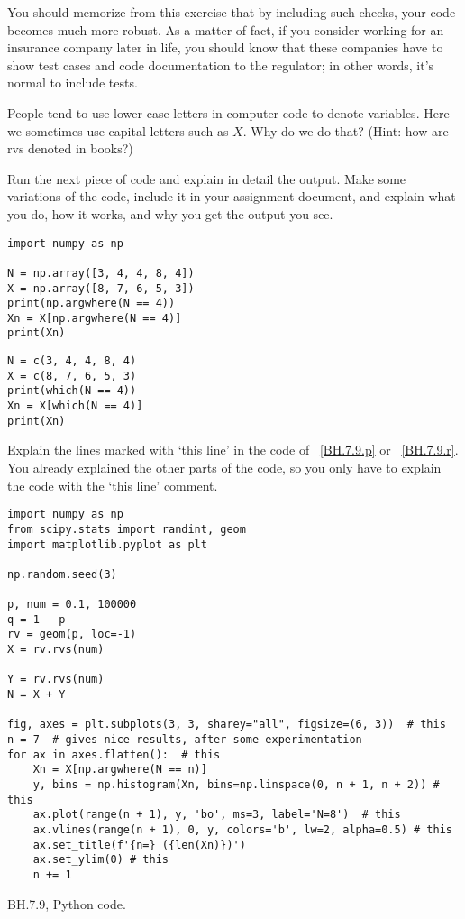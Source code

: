 You should memorize from this exercise that by including such checks, your code becomes much more robust.
As a matter of fact, if you consider working for an insurance company later in life, you should know that these companies have to show test cases and code documentation to the regulator; in other words, it's normal to include tests.

\begin{exercise}
People tend to use lower case letters in computer code to denote variables. Here we sometimes use capital letters such as $X$. Why do we do that? (Hint: how are rvs denoted in books?)
\end{exercise}


\begin{exercise}
Run the next piece of code and explain in detail the output. Make some variations of the code, include it in your assignment document, and explain what you do, how it works, and why you get the output you see.

\begin{verbatim}
import numpy as np

N = np.array([3, 4, 4, 8, 4])
X = np.array([8, 7, 6, 5, 3])
print(np.argwhere(N == 4))
Xn = X[np.argwhere(N == 4)]
print(Xn)
\end{verbatim}

\begin{verbatim}
N = c(3, 4, 4, 8, 4)
X = c(8, 7, 6, 5, 3)
print(which(N == 4))
Xn = X[which(N == 4)]
print(Xn)
\end{verbatim}
\end{exercise}

\begin{exercise}
Explain the lines marked with `this line' in the code of ~\cref{BH.7.9.p} or ~\cref{BH.7.9.r}. You already explained the other parts of the code, so you only have  to explain the  code with the `this line' comment.
\end{exercise}


\begin{listing}[!ht]
\begin{verbatim}
import numpy as np
from scipy.stats import randint, geom
import matplotlib.pyplot as plt

np.random.seed(3)

p, num = 0.1, 100000
q = 1 - p
rv = geom(p, loc=-1)
X = rv.rvs(num)

Y = rv.rvs(num)
N = X + Y

fig, axes = plt.subplots(3, 3, sharey="all", figsize=(6, 3))  # this
n = 7  # gives nice results, after some experimentation
for ax in axes.flatten():  # this
    Xn = X[np.argwhere(N == n)]
    y, bins = np.histogram(Xn, bins=np.linspace(0, n + 1, n + 2)) # this
    ax.plot(range(n + 1), y, 'bo', ms=3, label='N=8')  # this
    ax.vlines(range(n + 1), 0, y, colors='b', lw=2, alpha=0.5) # this
    ax.set_title(f'{n=} ({len(Xn)})')
    ax.set_ylim(0) # this
    n += 1
\end{verbatim}
\caption{BH.7.9, Python code.}
\label{BH.7.9.p}
\end{listing}


